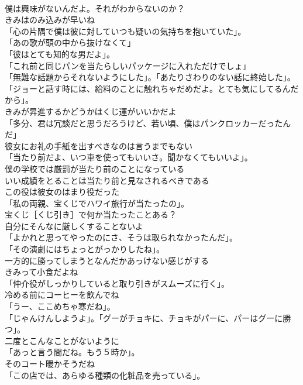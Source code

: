 \documentclass[8pt]{extreport}
\begin{document}
\begin{CJK}{UTF8}{min}
\\	僕は興味がないんだよ。それがわからないのか？	
\\	きみはのみ込みが早いね	
\\	「心の片隅で僕は彼に対していつも疑いの気持ちを抱いていた」。	
\\	「あの歌が頭の中から抜けなくて」	
\\	「彼はとても知的な男だよ」。	
\\	「これ前と同じパンを当たらしいパッケージに入れただけでしょ」	
\\	「無難な話題からそれないようにした」。「あたりさわりのない話に終始した」。「ジョーと話す時には、給料のことに触れちゃだめだよ。とても気にしてるんだから」。	
\\	きみが昇進するかどうかはくじ運がいいかだよ	
\\	「多分、君は冗談だと思うだろうけど、若い頃、僕はパンクロッカーだったんだ」	
\\	彼女にお礼の手紙を出すべきなのは言うまでもない	
\\	「当たり前だよ、いつ車を使ってもいいさ。聞かなくてもいいよ」。	
\\	僕の学校では厳罰が当たり前のことになっている	
\\	いい成績をとることは当たり前と見なされるべきである	
\\	この役は彼女のはまり役だった	
\\	「私の両親、宝くじでハワイ旅行が当たったの」。	
\\	宝くじ［くじ引き］で何か当たったことある？	
\\	自分にそんなに厳しくすることないよ	
\\	「よかれと思ってやったのにさ、そうは取られなかったんだ」。	
\\	「その演劇にはちょっとがっかりしたね」。	
\\	一方的に勝ってしまうとなんだかあっけない感じがする	
\\	きみって小食だよね	
\\	「仲介役がしっかりしていると取り引きがスムーズに行く」。	
\\	冷める前にコーヒーを飲んでね	
\\	「うー、ここめちゃ寒だね」。	
\\	「じゃんけんしようよ」。「グーがチョキに、チョキがパーに、パーはグーに勝つ」。	
\\	二度とこんなことがないように	
\\	「あっと言う間だね。もう５時か」。	
\\	そのコート暖かそうだね	
\\	「この店では、あらゆる種類の化粧品を売っている」。	

\end{CJK}
\end{document}
